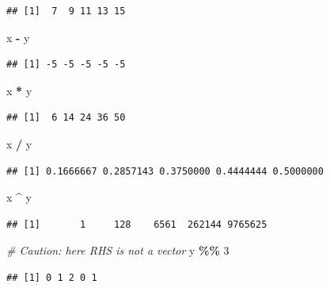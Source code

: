 \documentclass[
]{book}
\newenvironment{Shaded}{\begin{snugshade}}{\end{snugshade}}
\newcommand{\CommentTok}[1]{\textcolor[rgb]{0.56,0.35,0.01}{\textit{#1}}}
\newcommand{\DecValTok}[1]{\textcolor[rgb]{0.00,0.00,0.81}{#1}}
\newcommand{\NormalTok}[1]{#1}
\newcommand{\SpecialCharTok}[1]{\textcolor[rgb]{0.81,0.36,0.00}{\textbf{#1}}}
\begin{document}
\begin{verbatim}
## [1]  7  9 11 13 15
\end{verbatim}

\begin{Shaded}
\begin{Highlighting}[]
\NormalTok{x }\SpecialCharTok{{-}}\NormalTok{ y}
\end{Highlighting}
\end{Shaded}

\begin{verbatim}
## [1] -5 -5 -5 -5 -5
\end{verbatim}

\begin{Shaded}
\begin{Highlighting}[]
\NormalTok{x }\SpecialCharTok{*}\NormalTok{ y}
\end{Highlighting}
\end{Shaded}

\begin{verbatim}
## [1]  6 14 24 36 50
\end{verbatim}

\begin{Shaded}
\begin{Highlighting}[]
\NormalTok{x }\SpecialCharTok{/}\NormalTok{ y}
\end{Highlighting}
\end{Shaded}

\begin{verbatim}
## [1] 0.1666667 0.2857143 0.3750000 0.4444444 0.5000000
\end{verbatim}

\begin{Shaded}
\begin{Highlighting}[]
\NormalTok{x }\SpecialCharTok{\^{}}\NormalTok{ y}
\end{Highlighting}
\end{Shaded}

\begin{verbatim}
## [1]       1     128    6561  262144 9765625
\end{verbatim}

\begin{Shaded}
\begin{Highlighting}[]
\CommentTok{\# Caution: here RHS is not a vector}
\NormalTok{y }\SpecialCharTok{\%\%} \DecValTok{3}
\end{Highlighting}
\end{Shaded}

\begin{verbatim}
## [1] 0 1 2 0 1
\end{verbatim}
\end{document}

